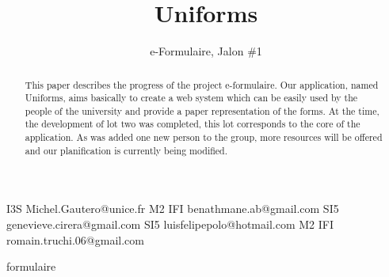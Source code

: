 \documentclass{sigplanconf}
\begin{document}
\setlength{\pdfpageheight}{\paperheight}
\setlength{\pdfpagewidth}{\paperwidth}




\permissiontopublish             %


\title{Uniforms}
\subtitle{e-Formulaire, Jalon \#1}

           {I3S}
           {Michel.Gautero@unice.fr}
           {M2 IFI}
           {benathmane.ab@gmail.com}
           {SI5}
           {genevieve.cirera@gmail.com}
           {SI5}
           {luisfelipepolo@hotmail.com}
           {M2 IFI}
           {romain.truchi.06@gmail.com}

\maketitle

\begin{abstract}
This paper describes the progress of the project e-formulaire. Our application, named Uniforms, aims basically to create a web system which can be easily used by the people of the university and provide a paper representation of the forms. At the time, the development of lot two was completed, this lot corresponds to the core of the application. As was added one new person to the group, more resources will be offered and our planification is currently being modified.
\end{abstract}


\terms
formulaire
\end{document}
